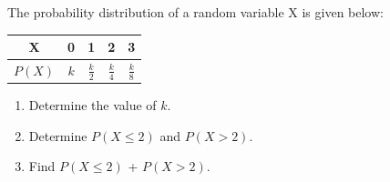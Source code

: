 \documentclass[journal,12pt,twocolumn]{IEEEtran}
\theoremstyle{remark}
\begin{document}
%
The probability distribution of a random variable X is given below:
\begin{table}[h]
    \centering
    \begin{tabular}{|c|c|c|c|c|}
        \hline
        X & 0 & 1 & 2 & 3 \\
        \hline
        $P(X)$ & $k$ & $\frac{k}{2}$ & $\frac{k}{4}$ & $\frac{k}{8}$ \\
        \hline
    \end{tabular}
\end{table}
\begin{enumerate}
    \item Determine the value of $k$.
    \item Determine $P(X \le 2)$ and $P(X > 2)$.
    \item Find $P(X \le 2)$ + $P(X > 2)$.
\end{enumerate}
\solution 
\fi
\end{document}
